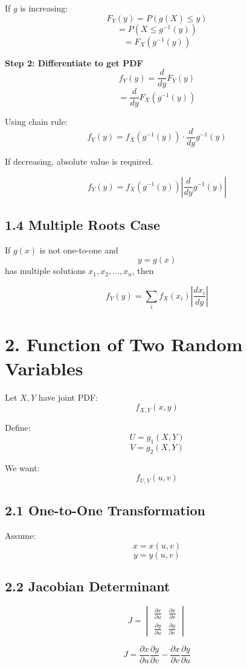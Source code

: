 \documentclass[12pt]{article}
\begin{document}
If $g$ is increasing:
\[
F_Y(y) = P(g(X) \le y)
\]
\[
= P(X \le g^{-1}(y))
\]
\[
= F_X(g^{-1}(y))
\]

\textbf{Step 2: Differentiate to get PDF}
\[
f_Y(y) = \frac{d}{dy} F_Y(y)
\]
\[
= \frac{d}{dy} F_X(g^{-1}(y))
\]

Using chain rule:
\[
f_Y(y) = f_X(g^{-1}(y)) \cdot \frac{d}{dy} g^{-1}(y)
\]

If decreasing, absolute value is required.

\[
\boxed{
f_Y(y) =
f_X(g^{-1}(y))
\left|
\frac{d}{dy} g^{-1}(y)
\right|
}
\]

\subsection*{1.4 Multiple Roots Case}

If $g(x)$ is not one-to-one and
\[
y = g(x)
\]
has multiple solutions $x_1, x_2, \dots, x_n$, then

\[
\boxed{
f_Y(y)
=
\sum_i
f_X(x_i)
\left|
\frac{dx_i}{dy}
\right|
}
\]

\section*{2. Function of Two Random Variables}

Let $X, Y$ have joint PDF:
\[
f_{X,Y}(x,y)
\]

Define:
\[
U = g_1(X,Y)
\]
\[
V = g_2(X,Y)
\]

We want:
\[
f_{U,V}(u,v)
\]

\subsection*{2.1 One-to-One Transformation}

Assume:
\[
x = x(u,v)
\]
\[
y = y(u,v)
\]

\subsection*{2.2 Jacobian Determinant}

\[
J =
\begin{vmatrix}
\frac{\partial x}{\partial u} & \frac{\partial x}{\partial v} \\
\frac{\partial y}{\partial u} & \frac{\partial y}{\partial v}
\end{vmatrix}
\]

\[
J =
\frac{\partial x}{\partial u}\frac{\partial y}{\partial v}
-
\frac{\partial x}{\partial v}\frac{\partial y}{\partial u}
\]
\end{document}
